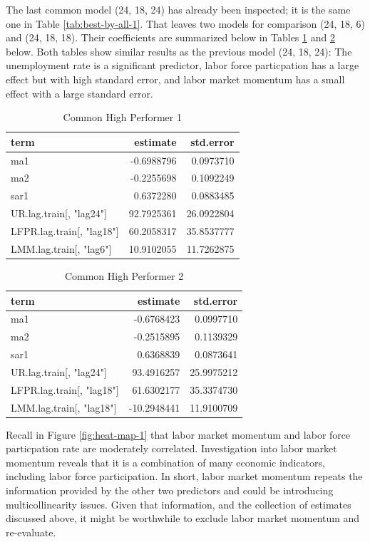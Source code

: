 \documentclass[12pt,letterpaper,toc=flat,oneside]{report}
\theoremstyle{definition}
\theoremstyle{definition}
\theoremstyle{definition}
\theoremstyle{remark}
\begin{document}
The last common model (24, 18, 24) has already been inspected; it is the
same one in Table \ref{tab:best-by-all-1}. That leaves two models for
comparison (24, 18, 6) and (24, 18, 18). Their coefficients are
summarized below in Tables \ref{tab:common-1} and \ref{tab:common-2}
below. Both tables show similar results as the previous model (24, 18,
24): The unemployment rate is a significant predictor, labor force
particpation has a large effect but with high standard error, and labor
market momentum has a small effect with a large standard error.

\begin{table}[!h]

\caption{\label{tab:common-1}Common High Performer 1}
\centering
\begin{tabular}[t]{lrr}
\toprule
\bfseries{term} & \bfseries{estimate} & \bfseries{std.error}\\
\midrule
ma1 & -0.6988796 & 0.0973710\\
ma2 & -0.2255698 & 0.1092249\\
sar1 & 0.6372280 & 0.0883485\\
UR.lag.train[, "lag24"] & 92.7925361 & 26.0922804\\
LFPR.lag.train[, "lag18"] & 60.2058317 & 35.8537777\\
LMM.lag.train[, "lag6"] & 10.9102055 & 11.7262875\\
\bottomrule
\end{tabular}
\end{table}

\begin{table}[!h]

\caption{\label{tab:common-2}Common High Performer 2}
\centering
\begin{tabular}[t]{lrr}
\toprule
\bfseries{term} & \bfseries{estimate} & \bfseries{std.error}\\
\midrule
ma1 & -0.6768423 & 0.0997710\\
ma2 & -0.2515895 & 0.1139329\\
sar1 & 0.6368839 & 0.0873641\\
UR.lag.train[, "lag24"] & 93.4916257 & 25.9975212\\
LFPR.lag.train[, "lag18"] & 61.6302177 & 35.3374730\\
LMM.lag.train[, "lag18"] & -10.2948441 & 11.9100709\\
\bottomrule
\end{tabular}
\end{table}

Recall in Figure \ref{fig:heat-map-1} that labor market momentum and
labor force particpation rate are moderately correlated. Investigation
into labor market momentum reveals that it is a combination of many
economic indicators, including labor force participation. In short,
labor market momentum repeats the information provided by the other two
predictors and could be introducing multicollinearity issues. Given that
information, and the collection of estimates discussed above, it might
be worthwhile to exclude labor market momentum and re-evaluate.
\end{document}
